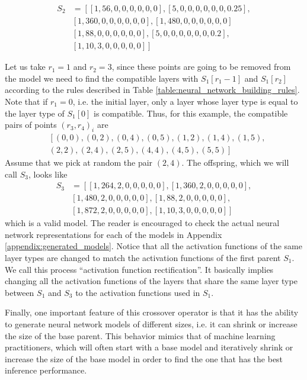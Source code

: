 \documentclass[preprint,12pt]{elsarticle}%
\begin{document}
\begin{align*}
S_2 & = \left[ \left[1, 56, 0, 0, 0, 0, 0, 0 \right], \left[5, 0, 0, 0, 0, 0, 0, 0.25 \right], \right. \\
&  \left. \left[1, 360, 0, 0, 0, 0, 0, 0 \right], \left[1, 480, 0, 0, 0, 0, 0, 0 \right] \right. \\
&  \left. \left[1, 88, 0, 0, 0, 0, 0, 0 \right], \left[5, 0, 0, 0, 0, 0, 0, 0.2 \right], \right. \\
&  \left. \left[1, 10, 3, 0, 0, 0, 0, 0 \right] \right]
\end{align*}

Let us take $r_1 = 1$ and $r_2 = 3$, since these points are going to be removed from the model we need to find the compatible layers with $S_1[r_1-1]$ and $S_1[r_2]$ according to the rules described in Table \ref{table:neural_network_building_rules}. Note that if $r_1 = 0$, i.e. the initial layer, only a layer whose layer type is equal to the layer type of $S_1[0]$ is compatible. Thus, for this example, the compatible pairs of points $(r_3, r_4)_i$ are
\begin{align*}
& \left[ (0, 0), (0, 2), (0, 4), (0, 5), (1, 2), (1, 4), (1, 5), \right. \\
& \left. (2, 2), (2, 4), (2, 5), (4, 4), (4, 5), (5, 5) \right]
\end{align*} 
Assume that we pick at random the pair $(2,4)$. The offspring, which we will call $S_3$, looks like
\begin{align*}
S_3 & = \left[ \left[1, 264, 2, 0, 0, 0, 0, 0 \right], \left[1, 360, 2, 0, 0, 0, 0, 0 \right], \right. \\
& \left. \left[1, 480, 2, 0, 0, 0, 0, 0 \right] , \left[1, 88, 2, 0, 0, 0, 0, 0 \right], \right. \\
& \left. \left[1, 872, 2, 0, 0, 0, 0, 0 \right], \left[1, 10, 3, 0, 0, 0, 0, 0 \right] \right]
\end{align*}
which is a valid model. The reader is encouraged to check the actual neural network representations for each of the models in Appendix \ref{appendix:generated_models}. Notice that all the activation functions of the same layer types are changed to match the activation functions of the first parent $S_1$. We call this process ``activation function rectification''. It basically implies changing all the activation functions of the layers that share the same layer type between $S_1$ and $S_3$ to the activation functions used in $S_1$. 

Finally, one important feature of this crossover operator is that it has the ability to generate neural network models of different sizes, i.e. it can shrink or increase the size of the base parent. This behavior mimics that of machine learning practitioners, which will often start with a base model and iteratively shrink or increase the size of the base model in order to find the one that has the best inference performance.
\end{document}
